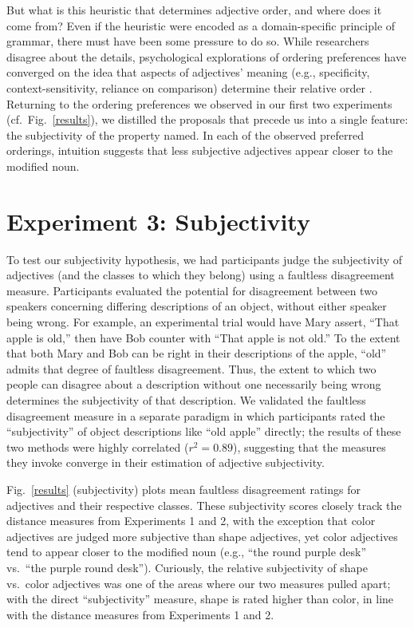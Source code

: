 \documentclass{pnastwo}
\begin{document}
\begin{article}
But what is this heuristic that determines adjective order, and where does it come from? Even if the heuristic were encoded as a domain-specific principle of grammar, there must have been some pressure to do so. While researchers disagree about the details, psychological explorations of ordering preferences have converged on the idea that aspects of  adjectives' meaning (e.g., specificity, context-sensitivity, reliance on comparison) determine their relative order \cite{sweet1898,ziff1960,martin1969determinants,martin1969competence,martin1970,kemmereretal2009}. Returning to the ordering preferences we observed in our first two experiments (cf.~Fig.~\ref{results}),
we distilled the proposals that precede us into a single feature: the subjectivity of the property named. In each of the observed preferred orderings, intuition suggests that less subjective adjectives appear closer to the modified noun. 
	
\section{Experiment 3: Subjectivity} 

To test our subjectivity hypothesis, we had participants judge the subjectivity of adjectives (and the classes to which they belong) using a faultless disagreement measure. Participants evaluated the potential for disagreement between two speakers concerning differing descriptions of an object, without either speaker being wrong. For example, an experimental trial would have Mary assert, ``That apple is old,'' then have Bob counter with ``That apple is not old.'' 
To the extent that both Mary and Bob can be right in their descriptions of the apple, ``old'' admits that degree of faultless disagreement. 
Thus, the extent to which two people can disagree about a description without one necessarily being wrong determines the subjectivity of that description. 
We validated the faultless disagreement measure in a separate paradigm in which participants rated the ``subjectivity'' of object descriptions like ``old apple'' directly; the results of these two methods were highly correlated ($r^{2} = 0.89$), suggesting that the measures they invoke converge in their estimation of adjective subjectivity.

Fig.~\ref{results} (subjectivity) plots mean faultless disagreement ratings for adjectives and their respective classes. These subjectivity scores closely track the distance measures from Experiments 1 and 2, with the exception that color adjectives are judged more subjective than shape adjectives, yet color adjectives tend to appear closer to the modified noun (e.g., ``the round purple desk'' vs.~``the purple round desk''). Curiously, the relative subjectivity of shape vs.~color adjectives was one of the areas where our two measures pulled apart; with the direct ``subjectivity'' measure, shape is rated higher than color, in line with the distance measures from Experiments 1 and 2.


\end{article}
\end{document}
